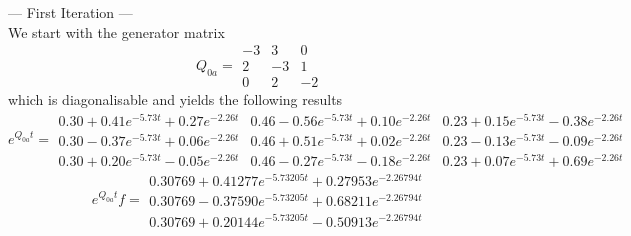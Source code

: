\documentclass{article}
\begin{document}
--- First Iteration ---\\
We start with the generator matrix 
\begin{equation*} 
 Q_{0a}= 
 \begin{array}{|rrr|}
  -3 & 3 & 0 \\
  2 & -3 & 1 \\
  0 & 2 & -2  
 \end{array}
 \end{equation*}
which is diagonalisable and yields the following results
\begin{equation*} 
 e^{Q_{0a}t}= 
 \begin{array}{|rrr|}
  0.30+0.41e^{-5.73t}+0.27e^{-2.26t} & 0.46-0.56e^{-5.73t}+0.10e^{-2.26t} & 0.23+0.15e^{-5.73t}-0.38e^{-2.26t} \\
  0.30-0.37e^{-5.73t}+0.06e^{-2.26t} & 0.46+0.51e^{-5.73t}+0.02e^{-2.26t} & 0.23-0.13e^{-5.73t}-0.09e^{-2.26t} \\
  0.30+0.20e^{-5.73t}-0.05e^{-2.26t} & 0.46-0.27e^{-5.73t}-0.18e^{-2.26t} & 0.23+0.07e^{-5.73t}+0.69e^{-2.26t}  
 \end{array}
 \end{equation*}
\begin{equation} \label{eQ0atf}
 e^{Q_{0a}t}f= 
 \begin{array}{|r|}
  0.30769+0.41277e^{-5.73205t}+0.27953e^{-2.26794t}\\
  0.30769-0.37590e^{-5.73205t}+0.68211e^{-2.26794t}\\
  0.30769+0.20144e^{-5.73205t}-0.50913e^{-2.26794t}
 \end{array}
 \end{equation}
\end{document}
